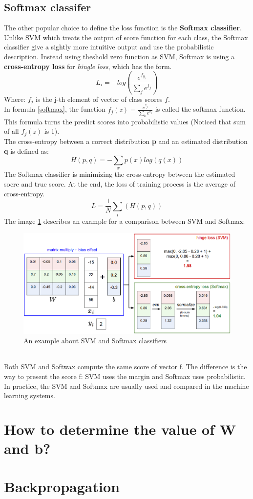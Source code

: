 \subsection{Softmax classifer}
The other popular choice to define the loss function  is the \textbf{Softmax classifier}. Unlike SVM which treats the output of score function for each class, the Softmax classifier give a sightly more intuitive output and use the probabilistic description. Instead using theshold zero function as SVM, Softmax is using a \textbf{cross-entropy loss} for \textit{hingle loss}, which has the form.
\begin{equation}
	L_i = -log(\frac{e^{f_{y_i}}}{\sum_j{e^{f_j}}})
	\label{softmax}
\end{equation}
Where: $f_j$ is the j-th element of vector of class scores \textbf{$f$}.\\[0.2cm]
In formula \ref{softmax}, the function $f_j(z) = \frac{e^{z_j}}{\sum_k{e^{z_k}}}$ is called the softmax function. This formula turns the predict scores into probabilistic values (Noticed that sum of all \textbf{$f_j(z) $} is 1).\\[0.2cm]
The cross-entropy between a correct distribution \textbf{p} and an estimated distribution \textbf{q} is defined as:
\begin{equation}
	H(p,q) = -\sum_x{p(x)log(q(x))}
\end{equation}
The Softmax classifier is minimizing the cross-entropy between the estimated socre and true score. At the end, the loss of training process is the average of cross-entropy.
\begin{equation}
	L = \frac{1}{N}\sum_i(H(p,q))
\end{equation}
The image \ref{figsvmsf} describes an example for a comparison between SVM and Softmax:
\begin{figure}[h]
	\centering
	\includegraphics[scale=0.45]{images/svmsf}
	\caption{An example about SVM and Softmax classifiers}
	\label{figsvmsf}
\end{figure}~\\[2.5cm]
Both SVM and Softwax compute the same score of vector f. The difference is the way to present the score f: SVM uses the margin and Softmax uses probabilistic. In practice, the SVM and Softmax are usually used and compared in the machine learning systems.
\section{How to determine the value of W and b?}
\section{Backpropagation}